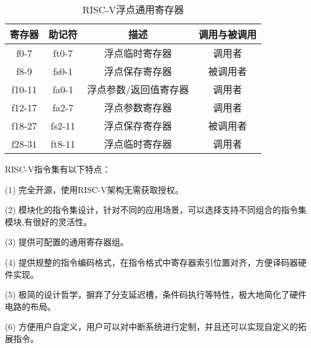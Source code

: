 \begin{table}[h]
  \centering
  \caption{RISC-V浮点通用寄存器}
  \label{tab:fpr}
  \begin{tabular}{cccc}
    \toprule
寄存器 &	助记符	& 描述 &	调用与被调用\\
    \midrule
    f0-7 & ft0-7 & 浮点临时寄存器 & 调用者\\
    f8-9 & fs0-1 & 浮点保存寄存器 & 被调用者\\
    f10-11 & fa0-1 & 浮点参数/返回值寄存器 & 调用者\\
    f12-17 & fa2-7 & 浮点参数寄存器 & 调用者\\
    f18-27 & fs2-11 & 浮点保存寄存器 & 被调用者\\
    f28-31 & ft8-11 & 浮点临时寄存器 & 调用者\\
    \bottomrule
  \end{tabular}
\end{table}


RISC-V指令集有以下特点：


(1) 完全开源，使用RISC-V架构无需获取授权。


(2) 模块化的指令集设计，针对不同的应用场景，可以选择支持不同组合的指令集模块,有很好的灵活性。


(3) 提供可配置的通用寄存器组。


(4) 提供规整的指令编码格式，在指令格式中寄存器索引位置对齐，方便译码器硬件实现。


(5) 极简的设计哲学，摒弃了分支延迟槽，条件码执行等特性，极大地简化了硬件电路的布局。


(6) 方便用户自定义，用户可以对中断系统进行定制，并且还可以实现自定义的拓展指令。
















